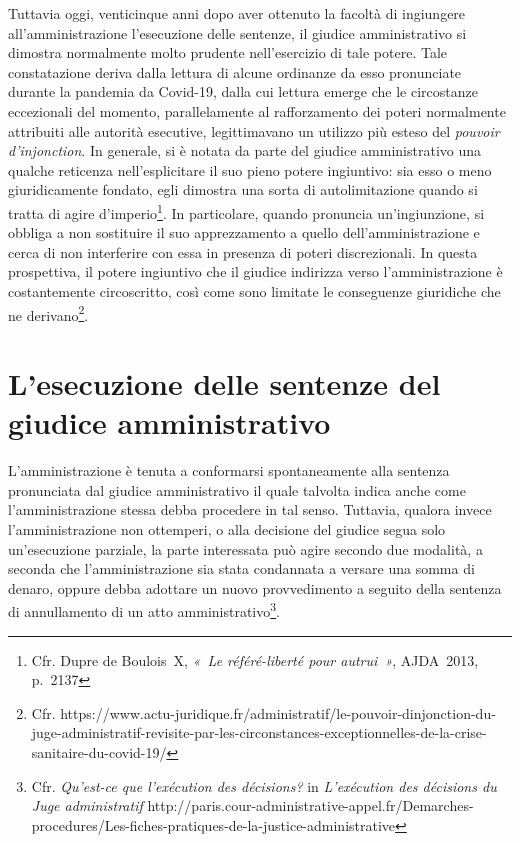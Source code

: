 \documentclass[12pt,it,a4paper,]{report}
\begin{document}
Tuttavia oggi, venticinque anni dopo aver ottenuto la facoltà di
ingiungere all'amministrazione l'esecuzione delle sentenze, il giudice
amministrativo si dimostra normalmente molto prudente nell'esercizio di
tale potere. Tale constatazione deriva dalla lettura di alcune ordinanze
da esso pronunciate durante la pandemia da Covid-19, dalla cui lettura
emerge che le circostanze eccezionali del momento, parallelamente al
rafforzamento dei poteri normalmente attribuiti alle autorità esecutive,
legittimavano un utilizzo più esteso del \emph{pouvoir d'injonction}. In
generale, si è notata da parte del giudice amministrativo una qualche
reticenza nell'esplicitare il suo pieno potere ingiuntivo: sia esso o
meno giuridicamente fondato, egli dimostra una sorta di autolimitazione
quando si tratta di agire d'imperio\footnote{Cfr. Dupre de Boulois~X,
  \emph{«~Le référé-liberté pour autrui~»}, AJDA~2013, p.~2137}. In
particolare, quando pronuncia un'ingiunzione, si obbliga a non
sostituire il suo apprezzamento a quello dell'amministrazione e cerca di
non interferire con essa in presenza di poteri discrezionali. In questa
prospettiva, il potere ingiuntivo che il giudice indirizza verso
l'amministrazione è costantemente circoscritto, così come sono limitate
le conseguenze giuridiche che ne derivano\footnote{Cfr.
  https://www.actu-juridique.fr/administratif/le-pouvoir-dinjonction-du-juge-administratif-revisite-par-les-circonstances-exceptionnelles-de-la-crise-sanitaire-du-covid-19/}.

\hypertarget{lesecuzione-delle-sentenze-del-giudice-amministrativo}{%
\section{L'esecuzione delle sentenze del giudice
amministrativo}\label{lesecuzione-delle-sentenze-del-giudice-amministrativo}}

L'amministrazione è tenuta a conformarsi spontaneamente alla sentenza
pronunciata dal giudice amministrativo il quale talvolta indica anche
come l'amministrazione stessa debba procedere in tal senso. Tuttavia,
qualora invece l'amministrazione non ottemperi, o alla decisione del
giudice segua solo un'esecuzione parziale, la parte interessata può
agire secondo due modalità, a seconda che l'amministrazione sia stata
condannata a versare una somma di denaro, oppure debba adottare un nuovo
provvedimento a seguito della sentenza di annullamento di un atto
amministrativo\footnote{Cfr. \emph{Qu'est-ce que l'exécution des
  décisions?} in \emph{L'exécution des décisions du Juge administratif}
  http://paris.cour-administrative-appel.fr/Demarches-procedures/Les-fiches-pratiques-de-la-justice-administrative}.
\end{document}
